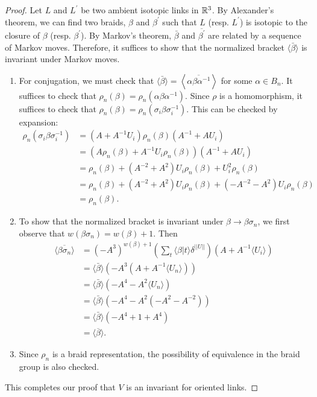 \begin{proof}
  Let $L$ and $L^{\prime}$ be two ambient isotopic links in $\mathbb{R}^3$. By Alexander's theorem, we can find two braids, $\beta$ and $\beta^{\prime}$ such that $L$ (resp. $L^{\prime}$) is isotopic to the closure of $\beta$ (resp. $\beta^{\prime}$). By Markov's theorem, $\bar{\beta}$ and $\overline{\beta^{\prime}}$ are related by a sequence of Markov moves. Therefore, it suffices to show that the normalized bracket $\langle \bar{\beta} \rangle$ is invariant under Markov moves. 
\begin{enumerate}
\item\label{item:8} For conjugation, we must check that $\langle \bar{\beta} \rangle = \left< \overline{\alpha\beta\alpha^{-1}} \right>$ for some $\alpha \in B_n$. It suffices to check that $\rho_n(\beta) = \rho_n(\alpha\beta\alpha^{-1})$. Since $\rho$ is a homomorphism, it suffices to check that $\rho_n(\beta) = \rho_n(\sigma_i\beta\sigma^{-1}_i)$. This can be checked by expansion: 
\begin{align*}
  \rho_n (\sigma_i\beta\sigma_i^{-1}) &= (A+A^{-1}U_i)\rho_n(\beta)(A^{-1} + AU_i) \\
                                      &= (A\rho_n(\beta) + A^{-1}U_i\rho_n(\beta) )(A^{-1} + AU_i) \\
                                      &= \rho_n(\beta) + (A^{-2} + A^2)U_i\rho_n(\beta) + U_i^2\rho_n(\beta) \\
                                      &= \rho_n(\beta) + (A^{-2} + A^2)U_i\rho_n(\beta) + (-A^{-2} - A^2)U_i\rho_n(\beta) \\
  &= \rho_n(\beta).
\end{align*}
\item\label{item:9} To show that the normalized bracket is invariant under $\beta \to \beta \sigma_n$, we first observe that $w(\beta \sigma_n) = w(\beta) + 1$. Then 
\begin{align*}
  \langle \overline{\beta\sigma_n}\rangle &= (-A^3)^{w(\beta) + 1} (\sum_t^{} \langle \beta | t \rangle \delta^{||U||})(A + A^{-1}\langle U_i \rangle) \\
                                          &= \langle \bar{\beta} \rangle (-A^3(A + A^{-1}\langle U_n \rangle)) \\
                                          &= \langle \bar{\beta} \rangle (-A^4 - A^2\langle U_n \rangle) \\
                                          &= \langle \bar{\beta} \rangle (-A^4 - A^2(-A^2 - A^{-2})) \\
                                          &= \langle \bar{\beta} \rangle (-A^4 + 1 + A^4) \\
  &= \langle \overline{\beta}\rangle.
\end{align*}
\item\label{item:7} Since $\rho_n$ is a braid representation, the possibility of equivalence in the braid group is also checked.
\end{enumerate}
This completes our proof that $V$ is an invariant for oriented links.
\end{proof}
